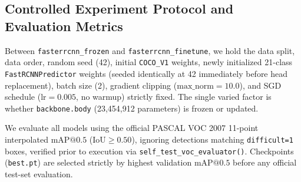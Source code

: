 \documentclass[twoside,final]{hcmut-report}
\begin{document}
\begin{table}[H]
\centering
\caption{Model Architectures and Hyperparameter Protocol}
\end{table}

\subsection{\textbf{Controlled Experiment Protocol and Evaluation Metrics}}
Between \texttt{fasterrcnn\_frozen} and \texttt{fasterrcnn\_finetune}, we hold the data split, data order, random seed (42), initial \texttt{COCO\_V1} weights, newly initialized 21-class \texttt{FastRCNNPredictor} weights (seeded identically at 42 immediately before head replacement), batch size (2), gradient clipping ($\text{max\_norm}=10.0$), and SGD schedule ($\text{lr}=0.005$, no warmup) strictly fixed. The single varied factor is whether \texttt{backbone.body} (23,454,912 parameters) is frozen or updated.

We evaluate all models using the official PASCAL VOC 2007 11-point interpolated $\text{mAP}@0.5$ ($\text{IoU}\ge0.50$), ignoring detections matching \texttt{difficult=1} boxes, verified prior to execution via \texttt{self\_test\_voc\_evaluator()}. Checkpoints (\texttt{best.pt}) are selected strictly by highest validation $\text{mAP}@0.5$ before any official test-set evaluation.
\end{document}
